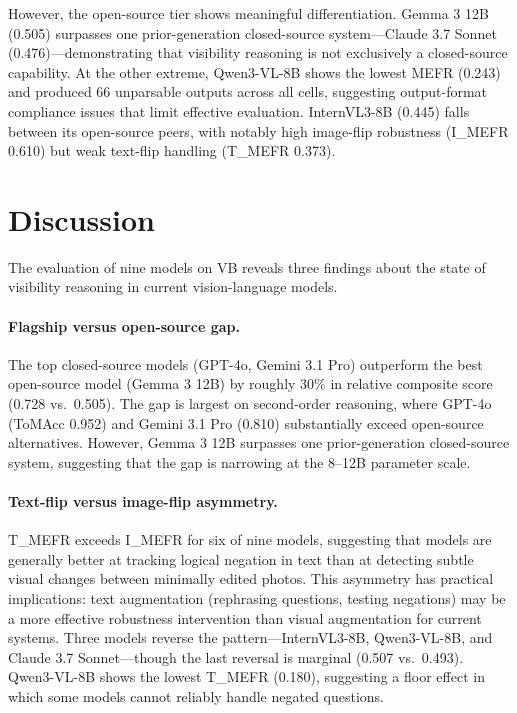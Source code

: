 \documentclass[11pt]{article}
\newcommand{\benchmarkname}{\textsc{VB}}
\begin{document}
However, the open-source tier shows meaningful differentiation. Gemma 3 12B (0.505) surpasses one prior-generation closed-source system---Claude 3.7 Sonnet (0.476)---demonstrating that visibility reasoning is not exclusively a closed-source capability. At the other extreme, Qwen3-VL-8B shows the lowest MEFR (0.243) and produced 66 unparsable outputs across all cells, suggesting output-format compliance issues that limit effective evaluation. InternVL3-8B (0.445) falls between its open-source peers, with notably high image-flip robustness (I\_MEFR 0.610) but weak text-flip handling (T\_MEFR 0.373).

\section{Discussion}

The evaluation of nine models on \benchmarkname{} reveals three findings about the state of visibility reasoning in current vision-language models.

\paragraph{Flagship versus open-source gap.} The top closed-source models (GPT-4o, Gemini 3.1 Pro) outperform the best open-source model (Gemma 3 12B) by roughly 30\% in relative composite score (0.728 vs.\ 0.505). The gap is largest on second-order reasoning, where GPT-4o (ToMAcc 0.952) and Gemini 3.1 Pro (0.810) substantially exceed open-source alternatives. However, Gemma 3 12B surpasses one prior-generation closed-source system, suggesting that the gap is narrowing at the 8--12B parameter scale.

\paragraph{Text-flip versus image-flip asymmetry.} T\_MEFR exceeds I\_MEFR for six of nine models, suggesting that models are generally better at tracking logical negation in text than at detecting subtle visual changes between minimally edited photos. This asymmetry has practical implications: text augmentation (rephrasing questions, testing negations) may be a more effective robustness intervention than visual augmentation for current systems. Three models reverse the pattern---InternVL3-8B, Qwen3-VL-8B, and Claude 3.7 Sonnet---though the last reversal is marginal (0.507 vs.\ 0.493). Qwen3-VL-8B shows the lowest T\_MEFR (0.180), suggesting a floor effect in which some models cannot reliably handle negated questions.
\end{document}
